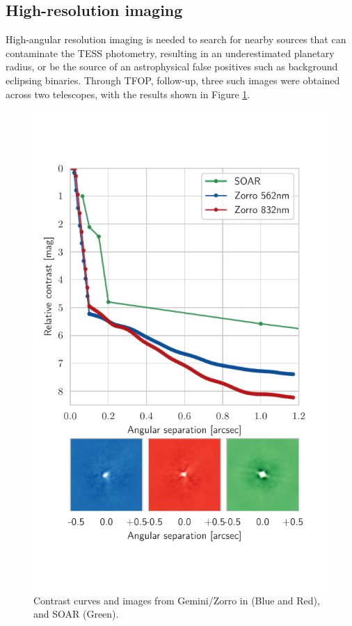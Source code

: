 \documentclass[fleqn,usenatbib]{mnras}
\begin{document}
\subsection{High-resolution imaging}
High-angular resolution imaging is needed to search for nearby sources that can contaminate the TESS photometry, resulting in an underestimated planetary radius, or be the source of an astrophysical false positives such as background eclipsing binaries. 
Through TFOP, follow-up, three such images were obtained across two telescopes, with the results shown in Figure \ref{fig:imaging}.
\begin{figure}
    \centering
    \includegraphics[width=\columnwidth, trim={0 2cm 0.6cm 1.6cm}]{Imaging}
    \caption{Contrast curves and images from Gemini/Zorro in  (Blue and Red), and SOAR (Green).}
    \label{fig:imaging}
\end{figure}
\end{document}
